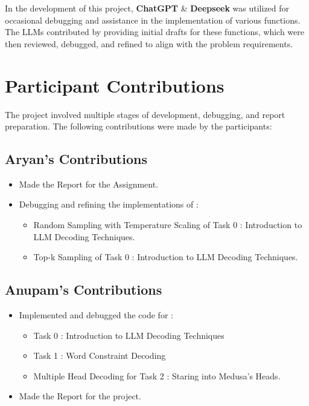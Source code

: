 \documentclass{article}
\begin{document}
In the development of this project, \textbf{ChatGPT} \& \textbf{Deepseek} was utilized for occasional debugging and assistance in the implementation of various functions. The LLMs contributed by providing initial drafts for these functions, which were then reviewed, debugged, and refined to align with the problem requirements.

\section{Participant Contributions}
\label{sec:participant_contributions}

The project involved multiple stages of development, debugging, and report preparation. The following contributions were made by the participants:

\subsection{Aryan's Contributions}
\begin{itemize}
    \item Made the Report for the Assignment.
    \item Debugging and refining the implementations of :
    \begin{itemize}
        \item Random Sampling with Temperature Scaling of Task 0 : Introduction to LLM Decoding Techniques.
        \item Top-k Sampling of Task 0 : Introduction to LLM Decoding Techniques.
    \end{itemize}
\end{itemize}

\subsection{Anupam's Contributions}
\begin{itemize}
    \item Implemented and debugged the code for :
    \begin{itemize}
    \item Task 0 : Introduction to LLM Decoding Techniques
    \item Task 1 : Word Constraint Decoding
    \item Multiple Head Decoding for Task 2 : Staring into Medusa's Heads.
    \end{itemize}
    \item Made the Report for the project.
\end{itemize}
\end{document}
